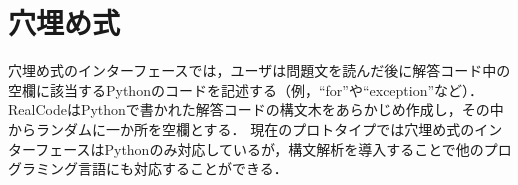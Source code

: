 \section{穴埋め式}

穴埋め式のインターフェースでは，ユーザは問題文を読んだ後に解答コード中の空欄に該当するPythonのコードを記述する（例，``for''や``exception''など）．
RealCodeはPythonで書かれた解答コードの構文木をあらかじめ作成し，その中からランダムに一か所を空欄とする．
現在のプロトタイプでは穴埋め式のインターフェースはPythonのみ対応しているが，構文解析を導入することで他のプログラミング言語にも対応することができる．


